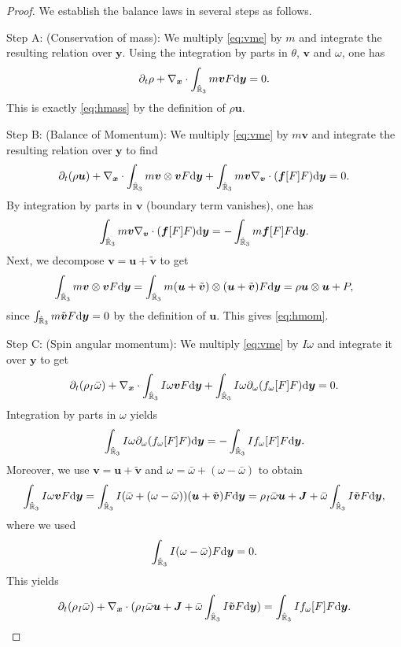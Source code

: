 \documentclass[a4paper,11pt]{article}
\numberwithin{equation}{section}
\theoremstyle{definition}
\newcommand{\bfs}[1]{{\boldsymbol #1}}
\newcommand{\bfx}{\boldsymbol{x}}
\newcommand{\bfy}{\boldsymbol{y}}
\newcommand{\bfv}{\boldsymbol{v}}
\newcommand{\bfuu}{\boldsymbol{u}}
\newcommand{\bff}{\boldsymbol{f}}
\newcommand{\bbr}{\mathbb R}
\def\d{{  \rm d}}
\begin{document}
\begin{proof}
We establish the balance laws in several steps as follows.

\noindent Step A: (Conservation of mass):
We multiply \eqref{eq:vme} by $m$ and integrate the resulting relation over $\bfy$. 
Using the integration by parts in $\theta$, $\bfv$ and $\omega$, one has
\[
\partial_t \rho + \nabla_{\bfx}\cdot\int_{\hat{\bbr}_3} m \bfv F \d\bfy = 0.
\]
This is exactly \eqref{eq:hmass} by the definition of $\rho\bfuu$.

\vspace{0.1cm}
\noindent Step B: (Balance of Momentum):
We multiply \eqref{eq:vme} by $m\bfv$ and integrate the resulting relation over $\bfy$ to find
\[
\partial_t(\rho\bfuu)+\nabla_{\bfx}\cdot\int_{\hat{\bbr}_3} m \bfv\otimes\bfv F \d\bfy
+\int_{\hat{\bbr}_3} m \bfv \nabla_{\bfv}\cdot(\bff[F]F) \d\bfy =0.
\]
By integration by parts in $\bfv$ (boundary term vanishes), one has
\[
\int_{\hat{\bbr}_3} m \bfv \nabla_{\bfv}\cdot(\bff[F]F) \d\bfy = -\int_{\hat{\bbr}_3} m \bff[F]F \d\bfy.
\]
Next, we decompose $\bfv=\bfuu+\tilde{\bfv}$ to get
\[
\int_{\hat{\bbr}_3} m \bfv\otimes\bfv F \d\bfy
=\int_{\hat{\bbr}_3} m(\bfuu+\tilde{\bfv})\otimes(\bfuu+\tilde{\bfv}) F \d\bfy
=\rho\bfuu\otimes\bfuu + P,
\]
since $\int_{\hat{\bbr}_3} m \tilde{\bfv} F \d\bfy=0$ by the definition of $\bfuu$.
This gives \eqref{eq:hmom}.

\noindent Step C: (Spin angular momentum):
We multiply \eqref{eq:vme} by $I\omega$ and integrate it over $\bfy$ to get
\[
\partial_t(\rho_I\bar\omega)+\nabla_{\bfx}\cdot\int_{\hat{\bbr}_3} I\omega \bfv F \d\bfy
+\int_{\hat{\bbr}_3} I\omega \partial_\omega(f_\omega[F]F) \d\bfy =0.
\]
Integration by parts in $\omega$ yields
\[
\int_{\hat{\bbr}_3} I\omega \partial_\omega(f_\omega[F]F) \d\bfy=-\int_{\hat{\bbr}_3} I f_\omega[F]F \d\bfy.
\]
Moreover, we use $\bfv=\bfuu+\tilde{\bfv}$ and $\omega=\bar\omega+(\omega-\bar\omega)$ to obtain
\[
\int_{\hat{\bbr}_3} I\omega \bfv F \d\bfy
=\int_{\hat{\bbr}_3} I(\bar\omega+(\omega-\bar\omega))(\bfuu+\tilde{\bfv}) F \d\bfy
=\rho_I\bar\omega \bfuu+\bfs{J} +\bar{\omega}\int_{\hat{\bbr}_3} I \tilde{\bfv} F \d\bfy,
\]
where we used 
\[
\int_{\hat{\bbr}_3} I(\omega-\bar\omega) F \d\bfy=0.
\]
This yields 
\begin{equation}
    \partial_t(\rho_I\bar\omega)+\nabla_{\bfx}\cdot(\rho_I\bar\omega \bfuu+\bfs{J}+\bar\omega\int_{\hat{\bbr}_3} I \tilde{\bfv} F \d\bfy)=\int_{\hat{\bbr}_3} I f_\omega[F] F \d\bfy. \label{eq:spinmom}
\end{equation}


\end{proof}
\end{document}
